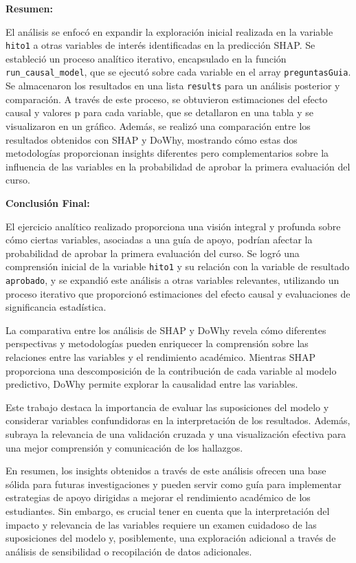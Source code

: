 \textbf{Resumen:}

El análisis se enfocó en expandir la exploración inicial realizada en la variable \texttt{hito1} a otras variables de interés identificadas en la predicción SHAP. Se estableció un proceso analítico iterativo, encapsulado en la función \texttt{run\_causal\_model}, que se ejecutó sobre cada variable en el array \texttt{preguntasGuia}. Se almacenaron los resultados en una lista \texttt{results} para un análisis posterior y comparación. A través de este proceso, se obtuvieron estimaciones del efecto causal y valores p para cada variable, que se detallaron en una tabla y se visualizaron en un gráfico. Además, se realizó una comparación entre los resultados obtenidos con SHAP y DoWhy, mostrando cómo estas dos metodologías proporcionan insights diferentes pero complementarios sobre la influencia de las variables en la probabilidad de aprobar la primera evaluación del curso.

\textbf{Conclusión Final:}

El ejercicio analítico realizado proporciona una visión integral y profunda sobre cómo ciertas variables, asociadas a una guía de apoyo, podrían afectar la probabilidad de aprobar la primera evaluación del curso. Se logró una comprensión inicial de la variable \texttt{hito1} y su relación con la variable de resultado \texttt{aprobado}, y se expandió este análisis a otras variables relevantes, utilizando un proceso iterativo que proporcionó estimaciones del efecto causal y evaluaciones de significancia estadística.

La comparativa entre los análisis de SHAP y DoWhy revela cómo diferentes perspectivas y metodologías pueden enriquecer la comprensión sobre las relaciones entre las variables y el rendimiento académico. Mientras SHAP proporciona una descomposición de la contribución de cada variable al modelo predictivo, DoWhy permite explorar la causalidad entre las variables.

Este trabajo destaca la importancia de evaluar las suposiciones del modelo y considerar variables confundidoras en la interpretación de los resultados. Además, subraya la relevancia de una validación cruzada y una visualización efectiva para una mejor comprensión y comunicación de los hallazgos.

En resumen, los insights obtenidos a través de este análisis ofrecen una base sólida para futuras investigaciones y pueden servir como guía para implementar estrategias de apoyo dirigidas a mejorar el rendimiento académico de los estudiantes. Sin embargo, es crucial tener en cuenta que la interpretación del impacto y relevancia de las variables requiere un examen cuidadoso de las suposiciones del modelo y, posiblemente, una exploración adicional a través de análisis de sensibilidad o recopilación de datos adicionales.


